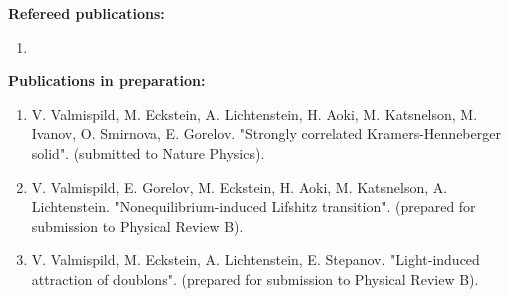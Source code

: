 \documentclass[
12pt, %
english, %
singlespacing, %
liststotoc, %
headsepline, %
]{MastersDoctoralThesis} %
\numberwithin{equation}{section}
\begin{document}
\begin{listofpub}
\addchaptertocentry{\listofpubname} %

\textbf{Refereed publications:}
    \begin{enumerate}
        \item{}
    \end{enumerate}

\textbf{Publications in preparation:}
    \begin{enumerate}
        \item V. Valmispild, M. Eckstein, A. Lichtenstein, H. Aoki, M. Katsnelson, M. Ivanov, O. Smirnova, E. Gorelov. "Strongly correlated Kramers-Henneberger solid". (submitted to Nature Physics).
        \item V. Valmispild, E. Gorelov, M. Eckstein, H. Aoki, M. Katsnelson, A. Lichtenstein. "Nonequilibrium-induced Lifshitz transition". (prepared for submission to Physical Review B).
         \item V. Valmispild, M. Eckstein, A. Lichtenstein, E. Stepanov. "Light-induced attraction of doublons". (prepared for submission to Physical Review B).     
              
    \end{enumerate}



\end{listofpub}
\end{document}
